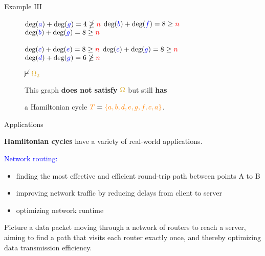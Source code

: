 \documentclass[pdf]{beamer}
\newcommand{\n}{\textcolor{red}{n}}
\newcommand{\T}{\textcolor{orange}{T}}
\newcommand{\bluea}{\textcolor{blue}{a}}
\newcommand{\blueb}{\textcolor{blue}{b}}
\newcommand{\bluec}{\textcolor{blue}{c}}
\newcommand{\blued}{\textcolor{blue}{d}}
\newcommand{\bluee}{\textcolor{blue}{e}}
\newcommand{\bluef}{\textcolor{blue}{f}}
\newcommand{\blueg}{\textcolor{blue}{g}}
\newcommand{\ore}{\textcolor{gold}{\Omega}}
\newcommand{\oresecondcond}{\textcolor{gold}{\Omega_2}}
\newcommand{\gdeg}{\text{deg}}
\begin{document}
\begin{frame}{Example III}
\begin{figure}
{            $\gdeg(\bluea) + \gdeg(\blueg) = 4 \ngeq \n $ \quad
            $\gdeg(\blueb) + \gdeg(\bluef) = 8 \geq \n $ \quad
            $\gdeg(\blueb) + \gdeg(\blueg) = 8 \geq \n$
            

            $\gdeg(\bluec) + \gdeg(\bluee) = 8 \geq \n$ \quad
            $\gdeg(\bluec) + \gdeg(\blueg) = 8 \geq \n$ \quad
            $\gdeg(\blued) + \gdeg(\blueg) = 6 \ngeq \n$}

            $\cancel\vdash \text{ } \oresecondcond$

            \vspace{5px}

            This graph \textbf{does not satisfy} $\ore$ but still \textbf{has}
            
            a Hamiltonian cycle $\T = \textcolor{orange}{\{a,b,d,e,g,f,c,a\}}$.
        \end{figure}
    \end{frame}


    \begin{frame}{Applications}
   
        \textbf{Hamiltonian cycles} have a variety of real-world applications.

        \vspace{10px}

        \textcolor{blue}{Network routing:}
        \begin{itemize}
            \item finding the most effective and efficient round-trip path between points A to B
            \item improving network traffic by reducing delays from client to server
            \item optimizing network runtime
        \end{itemize}

        \vspace{20px}

        Picture a data packet moving through a network of routers to reach a server, aiming to find a path that visits each router exactly once, and thereby optimizing data transmission efficiency.

    \end{frame}
\end{document}

